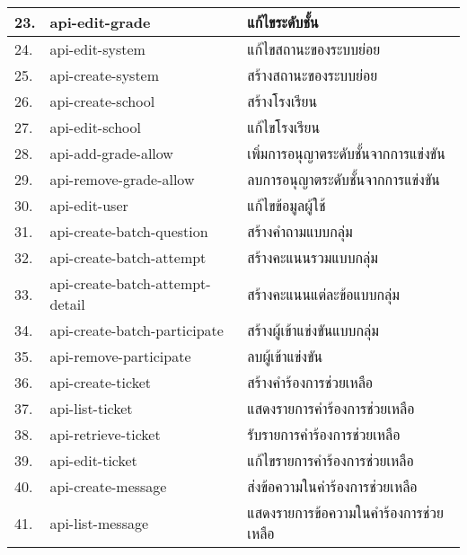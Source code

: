 \begin{longtable}{ | p{} | p{} | p{} | }
    \hline
    23. & api-edit-grade & แก้ไขระดับชั้น \\
    \hline
    24. & api-edit-system & แก้ไขสถานะของระบบย่อย \\
    \hline
    25. & api-create-system & สร้างสถานะของระบบย่อย \\
    \hline
    26. & api-create-school & สร้างโรงเรียน \\
    \hline
    27. & api-edit-school & แก้ไขโรงเรียน \\
    \hline
    28. & api-add-grade-allow & เพิ่มการอนุญาตระดับชั้นจากการแข่งขัน \\
    \hline
    29. & api-remove-grade-allow & ลบการอนุญาตระดับชั้นจากการแข่งขัน \\
    \hline
    30. & api-edit-user & แก้ไขข้อมูลผู้ใช้ \\
    \hline
    31. & api-create-batch-question & สร้างคำถามแบบกลุ่ม \\
    \hline
    32. & api-create-batch-attempt & สร้างคะแนนรวมแบบกลุ่ม \\
    \hline
    33. & api-create-batch-attempt-detail & สร้างคะแนนแต่ละข้อแบบกลุ่ม \\
    \hline
    34. & api-create-batch-participate & สร้างผู้เข้าแข่งขันแบบกลุ่ม \\
    \hline
    35. & api-remove-participate & ลบผู้เข้าแข่งขัน \\
    \hline
    36. & api-create-ticket & สร้างคำร้องการช่วยเหลือ \\
    \hline
    37. & api-list-ticket & แสดงรายการคำร้องการช่วยเหลือ \\
    \hline
    38. & api-retrieve-ticket & รับรายการคำร้องการช่วยเหลือ \\
    \hline
    39. & api-edit-ticket & แก้ไขรายการคำร้องการช่วยเหลือ \\
    \hline
    40. & api-create-message & ส่งข้อความในคำร้องการช่วยเหลือ \\
    \hline
    41. & api-list-message & แสดงรายการข้อความในคำร้องการช่วยเหลือ \\
    \hline
\end{longtable}
